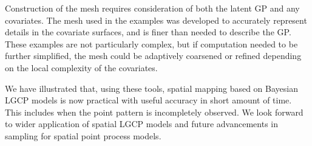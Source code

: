\documentclass[]{interact}
\begin{document}
Construction of the mesh requires consideration of both the latent GP and any
covariates. The mesh used in the examples was developed to accurately represent
details in the covariate surfaces, and is finer than needed to describe the
GP. These examples are not particularly complex, but if computation needed
to be further simplified, the mesh could be adaptively coarsened or refined
depending on the local complexity of the covariates.


We have illustrated that, using these tools, spatial mapping based on Bayesian
LGCP models is now practical with useful accuracy in short amount of time. This
includes when the point pattern is incompletely observed. We look forward to
wider application of spatial LGCP models and future advancements in sampling
for spatial point process models.







\end{document}
